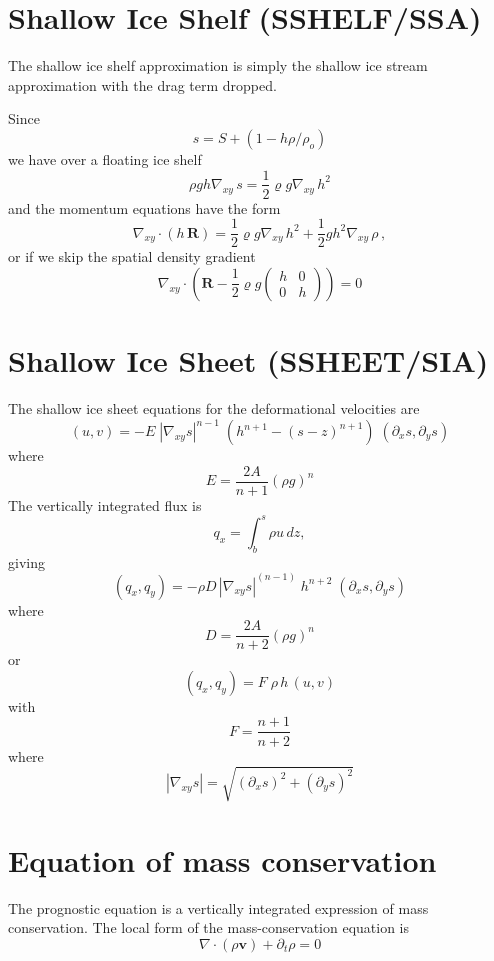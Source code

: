 \documentclass[10pt,a4paper]{book}
\newcommand{\p}{\partial}
\begin{document}
\section{Shallow Ice Shelf (SSHELF/SSA)}


The shallow ice shelf approximation is simply the shallow ice stream
approximation with the drag term dropped. 

Since 
\[
s= S+(1-h \rho/\rho_o )
\]
we have over a floating ice shelf
\[
  \rho g h \nabla_{xy}  \, s  =   \frac{1}{2} \varrho g  \nabla_{xy}  \, h^2  
\]
and the momentum equations have the form
\begin{equation}
\nabla_{xy} \cdot (h \, \bm{R}) =  \frac{1}{2} \varrho g  \nabla_{xy}  \, h^2   + \frac{1}{2} g h^2 \nabla_{xy} \, \rho \, ,
\label{eq:FEao2}
\end{equation}
or if we skip the spatial density gradient
\begin{equation}
\nabla_{xy} \cdot \left (  \bm{R} 
-  \frac{1}{2} \varrho g   \begin{pmatrix} h & 0 \\ 0 & h \end{pmatrix}  \right ) = 0
\end{equation}


\section{Shallow Ice Sheet (SSHEET/SIA)}

The shallow ice sheet equations for the deformational velocities are
\[
(u,v)=-E \; |\nabla_{xy} s|^{n-1} \; \left (h^{n+1}-(s-z)^{n+1} \right ) \;(\p_x s,\p_y s)
\]
where
\[ 
E=\frac{2 A}{n+1}  (\rho g)^n 
\] 
The vertically integrated flux is
\[
q_x=\int_b^s \rho u \, dz ,
\]
giving
\[
(q_x,q_y)=-\rho D\,  |\nabla_{xy} s|^{(n-1)} \; h^{n+2} \; (\p_x s , \p_y s)
\]
where
\[
D=\frac{2 A }{n+2}  (\rho g)^n
\]
or
\[
(q_x,q_y)=F \; \rho \, h\,  (u,v)
\]
with
\[
F=\frac{n+1}{n+2}
\]
where
\[
|\nabla_{xy} s|=\sqrt{(\p_x s)^2+(\p_y s)^2}
\]





\section{Equation of mass conservation}

The prognostic equation is a vertically integrated expression of mass
conservation.  The local form of the mass-conservation equation is
\begin{equation}
\nabla \cdot (\rho \bm{v})+ \p_t \rho =0
\label{eq:mgen}
\end{equation}
\end{document}
